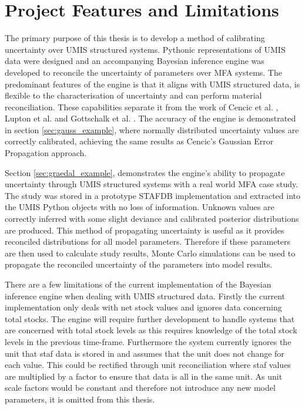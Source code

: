 \documentclass[ %
                    author={Tom Jager},
                supervisor={Dr. Daniel Schien},
                    degree={MEng},
                     title={A Bayesian Inference Engine for Calibrating Uncertainty over UMIS Structured MFA Systems},
                  subtitle={},
                      type={research},
                      year={2019} ]{dissertation}
\begin{document}
\section{Project Features and Limitations}
The primary purpose of this thesis is to develop a method of calibrating uncertainty over UMIS structured systems. Pythonic representations of UMIS data were designed and an accompanying Bayesian inference engine was developed to reconcile the uncertainty of parameters over MFA systems. The predominant features of the engine is that it aligns with UMIS structured data, is flexible to the characterisation of uncertainty and can perform material reconciliation. These capabilities separate it from the work of Cencic et al. \cite{cencic2016nonlinear, cencic2015general, cencic2018data}, Lupton et al. \cite{lupton2018incremental} and Gottschalk et al. \cite{gottschalk2010probabilistic}. The accuracy of the engine is demonstrated in section \ref{sec:gauss_example}, where normally distributed uncertainty values are correctly calibrated, achieving the same results as Cencic's Gaussian Error Propagation approach. 

Section \ref{sec:graedal_example}, demonstrates the engine's ability to propagate uncertainty through UMIS structured systems with a real world MFA case study. The study was stored in a prototype STAFDB implementation and extracted into the UMIS Python objects with no loss of information. Unknown values are correctly inferred with some slight deviance and calibrated posterior distributions are produced. This method of propagating uncertainty is useful as it provides reconciled distributions for all model parameters. Therefore if these parameters are then used to calculate study results, Monte Carlo simulations can be used to propagate the reconciled uncertainty of the parameters into model results.

There are a few limitations of the current implementation of the Bayesian inference engine when dealing with UMIS structured data. Firstly the current implementation only deals with net stock values and ignores data concerning total stocks. The engine will require further development to handle systems that are concerned with total stock levels as this requires knowledge of the total stock levels in the previous time-frame. Furthermore the system currently ignores the unit that staf data is stored in and assumes that the unit does not change for each value. This could be rectified through unit reconciliation where staf values are multiplied by a factor to ensure that data is all in the same unit. As unit scale factors would be constant and therefore not introduce any new model parameters, it is omitted from this thesis.
\end{document}
